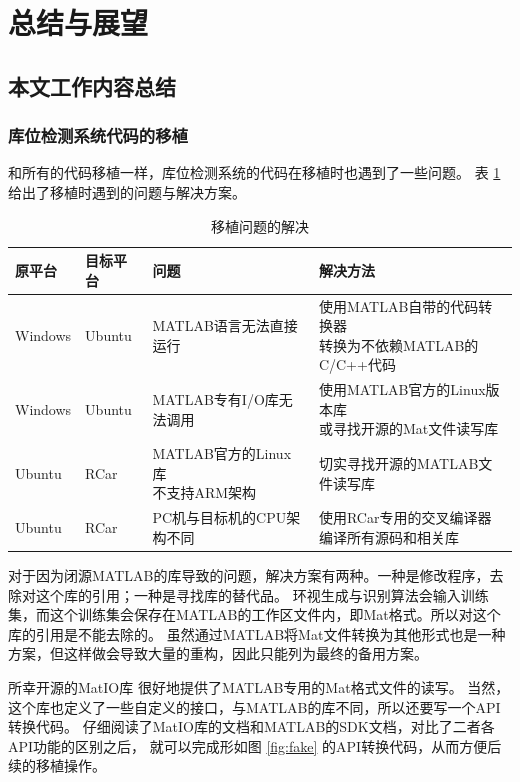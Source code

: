 
\section{总结与展望}

\subsection{本文工作内容总结}
\subsubsection{库位检测系统代码的移植}
和所有的代码移植一样，库位检测系统的代码在移植时也遇到了一些问题。
表 \ref{tab:porting} 给出了移植时遇到的问题与解决方案。

\begin{table}[!hbt]
\centering
\caption{移植问题的解决} \label{tab:porting}
\renewcommand{\arraystretch}{2.62}
\begin{tabular}{llll}
\hline 原平台 & 目标平台 & 问题 & 解决方法 \\ \hline
Windows & Ubuntu & MATLAB语言无法直接运行 & \makecell[l]{使用MATLAB自带的代码转换器 \\ 转换为不依赖MATLAB的C/C++代码} \\
Windows & Ubuntu & MATLAB专有I/O库无法调用 & \makecell[l]{使用MATLAB官方的Linux版本库 \\ 或寻找开源的Mat文件读写库} \\
Ubuntu & RCar & \makecell[l]{MATLAB官方的Linux库 \\ 不支持ARM架构} & 切实寻找开源的MATLAB文件读写库 \\
Ubuntu & RCar & PC机与目标机的CPU架构不同 & \makecell[l]{使用RCar专用的交叉编译器 \\ 编译所有源码和相关库} \\
\hline
\end{tabular}
\end{table}

对于因为闭源MATLAB的库导致的问题，解决方案有两种。一种是修改程序，去除对这个库的引用；一种是寻找库的替代品。
环视生成与识别算法会输入训练集，而这个训练集会保存在MATLAB的工作区文件内，即Mat格式。所以对这个库的引用是不能去除的。
虽然通过MATLAB将Mat文件转换为其他形式也是一种方案，但这样做会导致大量的重构，因此只能列为最终的备用方案。

所幸开源的MatIO库 \cite{matio} 很好地提供了MATLAB专用的Mat格式文件的读写。
当然，这个库也定义了一些自定义的接口，与MATLAB的库不同，所以还要写一个API转换代码。
仔细阅读了MatIO库的文档和MATLAB的SDK文档，对比了二者各API功能的区别之后，
就可以完成形如图 \ref{fig:fake} 的API转换代码，从而方便后续的移植操作。

